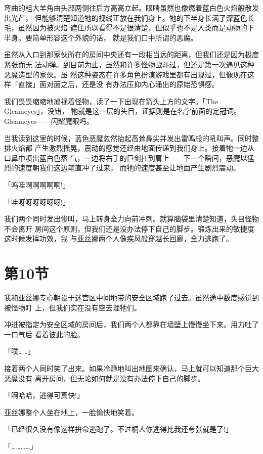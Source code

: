 \documentclass[11pt]{book}
\begin{document}
弯曲的粗大羊角由头部两侧往后方高高立起。眼睛虽然也像燃着蓝白色火焰般散发出光芒，
但能够清楚知道牠的视线正放在我们身上。牠的下半身长满了深蓝色长毛，虽然因为被火焰
遮住所以看得不是很清楚，但似乎也不是人类而是动物的下半身。要简单形容这个外貌的话，
就是我们口中所谓的恶魔。

虽然从入口到那家伙所在的房间中央还有一段相当远的距离，但我们还是因为极度紧张而无
法动弹。到目前为止，虽然和许多怪物战斗过，但还是第一次遇见这种恶魔造型的家伙。虽
然这种姿态在许多角色扮演游戏里都有出现过，但像现在这样「直接」面对面之后，还是没
有办法压抑内心涌出的原始恐惧感。

我们畏畏缩缩地凝视着怪物，读了一下出现在箭头上方的文字。「The Gleameyes」，没错，
牠就是这一层的头目，证据则是在名字前面的定冠词。Gleameyes——闪耀魔眼吗。







当我读到这里的时候，蓝色恶魔忽然抬起高耸鼻尖并发出雷鸣般的吼叫声。同时整排火焰都
产生激烈摇晃，震动的感觉还经由地面传递到我们身上。接着牠一边从口鼻中喷出蓝白色蒸
气，一边将右手的巨剑扛到肩上——下一个瞬间，恶魔以猛烈的速度朝我们这边笔直冲了过来，
而牠的速度甚至让地面产生剧烈震动。

「呜哇啊啊啊啊啊!」

「哇呀呀呀呀呀呀!」

我们两个同时发出惨叫，马上转身全力向前冲刺。就算脑袋里清楚知道，头目怪物不会离开
房间这个原则，但我们还是没办法停下自己的脚步。锻炼出来的敏捷度这时候发挥功效，我
与亚丝娜两个人像疾风般穿越长回廊，全力逃跑了。
\section{第10节}
\label{sec:orge7d9686}
我和亚丝娜专心朝设于迷宫区中间地带的安全区域跑了过去。虽然途中数度感觉到被怪物盯
上，但我们实在没有空去理牠们。

冲进被指定为安全区域的房间后，我们两个人都靠在墙壁上慢慢坐下来。用力吐了一口气后
看着彼此的脸。

「噗……」

接着两个人同时笑了出来。如果冷静地叫出地图来确认，马上就可以知道那个巨大恶魔没有
离开房间，但无论如何就是没有办法停下自己的脚步。

「啊哈哈，逃得可真快!」

亚丝娜整个人坐在地上，一脸愉快地笑着。

「已经很久没有像这样拚命逃跑了。不过桐人你逃得比我还夸张就是了!」

「…………」
\end{document}

